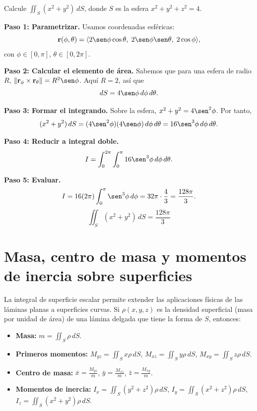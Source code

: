 \begin{example}
Calcule $\displaystyle \iint_S (x^2+y^2)\,dS$, donde $S$ es la esfera $x^2+y^2+z^2=4$.
\begin{myproof}
\textbf{Paso 1: Parametrizar.}
Usamos coordenadas esféricas:
\[
\mathbf{r}(\phi,\theta)=\langle 2\sen\phi\cos\theta,\; 2\sen\phi\sen\theta,\; 2\cos\phi \rangle,
\]
con $\phi\in[0,\pi]$, $\theta\in[0,2\pi]$.

\textbf{Paso 2: Calcular el elemento de área.}
Sabemos que para una esfera de radio $R$, $\|\mathbf{r}_\phi \times \mathbf{r}_\theta\| = R^2\sen\phi$. Aquí $R=2$, así que
\[
dS = 4\sen\phi\,d\phi\,d\theta.
\]

\textbf{Paso 3: Formar el integrando.}
Sobre la esfera, $x^2+y^2 = 4\sen^2\phi$. Por tanto,
\[
(x^2+y^2)\,dS = (4\sen^2\phi)(4\sen\phi)\,d\phi\,d\theta = 16\sen^3\phi\,d\phi\,d\theta.
\]

\textbf{Paso 4: Reducir a integral doble.}
\[
I = \int_0^{2\pi}\int_0^\pi 16\sen^3\phi\,d\phi\,d\theta.
\]

\textbf{Paso 5: Evaluar.}
\[
I = 16(2\pi)\int_0^\pi \sen^3\phi\,d\phi
= 32\pi \cdot \frac{4}{3}
= \frac{128\pi}{3}.
\]
\[
\boxed{\displaystyle \iint_S (x^2+y^2)\,dS = \frac{128\pi}{3}}
\]
\end{myproof}
\end{example}

\section{Masa, centro de masa y momentos de inercia sobre superficies}

La integral de superficie escalar permite extender las aplicaciones físicas de las láminas planas a superficies curvas. Si $\rho(x,y,z)$ es la densidad superficial (masa por unidad de área) de una lámina delgada que tiene la forma de $S$, entonces:

\begin{itemize}
\item \textbf{Masa:} $\displaystyle m = \iint_S \rho\,dS$.
\item \textbf{Primeros momentos:} 
  $\displaystyle M_{yz} = \iint_S x\rho\,dS$, 
  $\displaystyle M_{xz} = \iint_S y\rho\,dS$, 
  $\displaystyle M_{xy} = \iint_S z\rho\,dS$.
\item \textbf{Centro de masa:} 
  $\displaystyle \bar{x} = \frac{M_{yz}}{m}$, 
  $\displaystyle \bar{y} = \frac{M_{xz}}{m}$, 
  $\displaystyle \bar{z} = \frac{M_{xy}}{m}$.
\item \textbf{Momentos de inercia:} 
  $\displaystyle I_x = \iint_S (y^2+z^2)\rho\,dS$, 
  $\displaystyle I_y = \iint_S (x^2+z^2)\rho\,dS$, 
  $\displaystyle I_z = \iint_S (x^2+y^2)\rho\,dS$.
\end{itemize}

